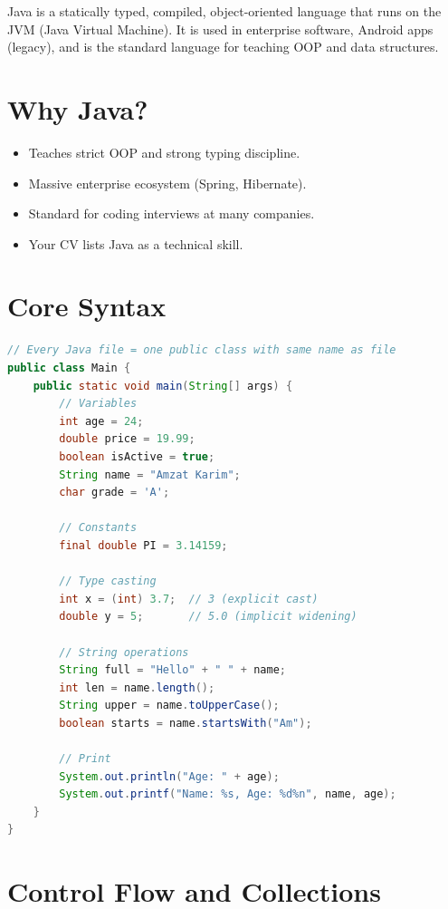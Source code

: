 \documentclass[12pt, a4paper, oneside]{book}
\begin{document}
Java is a statically typed, compiled, object-oriented language that runs on the JVM (Java Virtual Machine). It is used in enterprise software, Android apps (legacy), and is the standard language for teaching OOP and data structures.

\section{Why Java?}
\begin{itemize}[leftmargin=2em]
    \item Teaches strict OOP and strong typing discipline.
    \item Massive enterprise ecosystem (Spring, Hibernate).
    \item Standard for coding interviews at many companies.
    \item Your CV lists Java as a technical skill.
\end{itemize}

\section{Core Syntax}

\begin{lstlisting}[language=Java, caption={Java basics}]
// Every Java file = one public class with same name as file
public class Main {
    public static void main(String[] args) {
        // Variables
        int age = 24;
        double price = 19.99;
        boolean isActive = true;
        String name = "Amzat Karim";
        char grade = 'A';

        // Constants
        final double PI = 3.14159;

        // Type casting
        int x = (int) 3.7;  // 3 (explicit cast)
        double y = 5;       // 5.0 (implicit widening)

        // String operations
        String full = "Hello" + " " + name;
        int len = name.length();
        String upper = name.toUpperCase();
        boolean starts = name.startsWith("Am");

        // Print
        System.out.println("Age: " + age);
        System.out.printf("Name: %s, Age: %d%n", name, age);
    }
}
\end{lstlisting}

\section{Control Flow and Collections}
\end{document}
